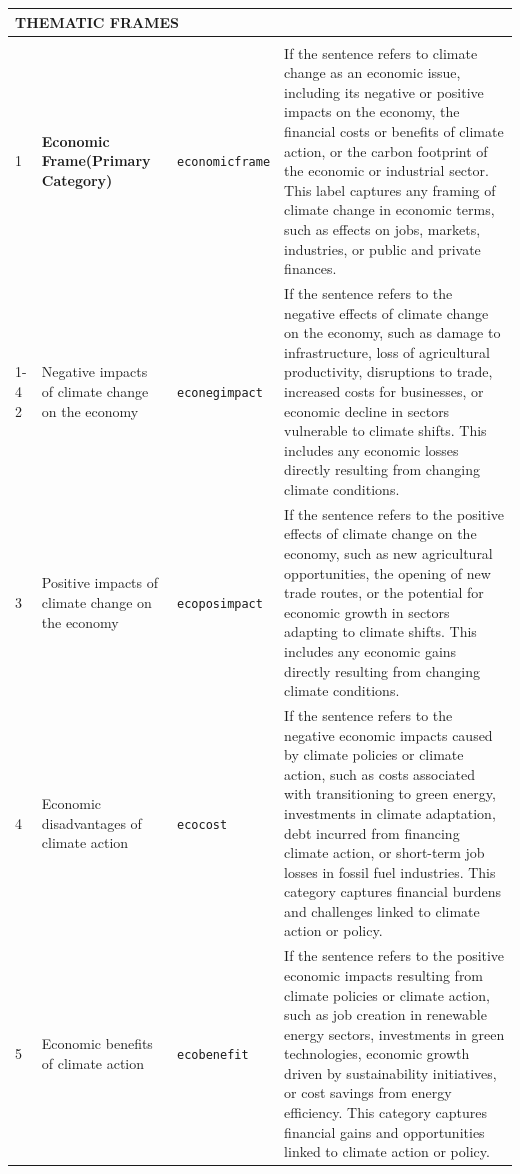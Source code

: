 \documentclass[12pt]{article}
\renewcommand\_{\texttt{\detokenize{_}\allowbreak}}
\begin{document}
{\begin{longtable}{p{0.5cm}p{4.5cm}p{2.8cm}p{13.5cm}}
\multicolumn{4}{l}{\cellcolor{gray!10}\textbf{THEMATIC FRAMES}} \\
\midrule
\rowcolor{gray!8}
\multicolumn{4}{l}{\textit{Economic Frame}} \\
\midrule
1 & \textbf{Economic Frame\newline (Primary Category)} & \texttt{economic\_frame} & If the sentence refers to climate change as an economic issue, including its negative or positive impacts on the economy, the financial costs or benefits of climate action, or the carbon footprint of the economic or industrial sector. This label captures any framing of climate change in economic terms, such as effects on jobs, markets, industries, or public and private finances. \\
\cmidrule(lr){1-4}
2 & Negative impacts of climate change on the economy & \texttt{eco\_neg\_impact} & If the sentence refers to the negative effects of climate change on the economy, such as damage to infrastructure, loss of agricultural productivity, disruptions to trade, increased costs for businesses, or economic decline in sectors vulnerable to climate shifts. This includes any economic losses directly resulting from changing climate conditions. \\
3 & Positive impacts of climate change on the economy & \texttt{eco\_pos\_impact} & If the sentence refers to the positive effects of climate change on the economy, such as new agricultural opportunities, the opening of new trade routes, or the potential for economic growth in sectors adapting to climate shifts. This includes any economic gains directly resulting from changing climate conditions. \\
4 & Economic disadvantages of climate action & \texttt{eco\_cost} & If the sentence refers to the negative economic impacts caused by climate policies or climate action, such as costs associated with transitioning to green energy, investments in climate adaptation, debt incurred from financing climate action, or short-term job losses in fossil fuel industries. This category captures financial burdens and challenges linked to climate action or policy. \\
5 & Economic benefits of climate action & \texttt{eco\_benefit} & If the sentence refers to the positive economic impacts resulting from climate policies or climate action, such as job creation in renewable energy sectors, investments in green technologies, economic growth driven by sustainability initiatives, or cost savings from energy efficiency. This category captures financial gains and opportunities linked to climate action or policy. \\

\end{longtable}}
\end{document}
